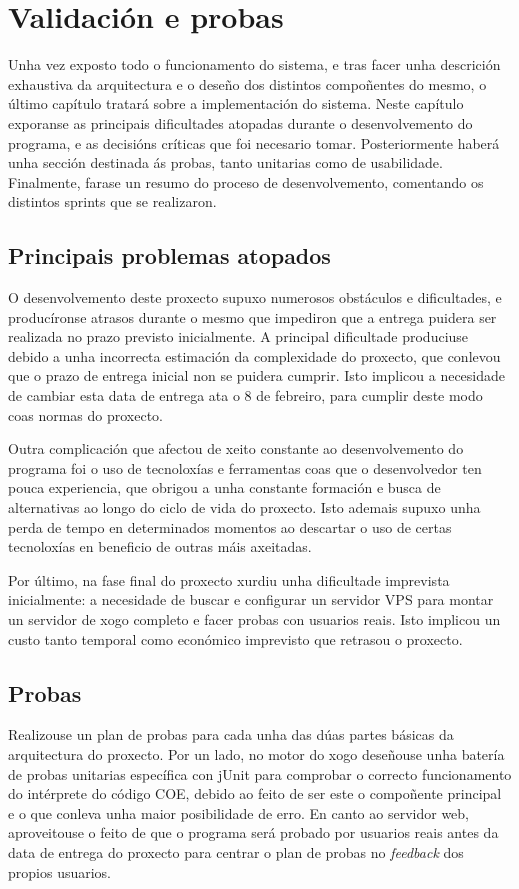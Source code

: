 \chapter{Validación e probas}
\label{ch:implementacion}
Unha vez exposto todo o funcionamento do sistema, e tras facer unha descrición
exhaustiva da arquitectura e o deseño dos distintos compoñentes do mesmo, o
último capítulo tratará sobre a implementación do sistema. Neste capítulo
exporanse as principais dificultades atopadas durante o desenvolvemento do
programa, e as decisións críticas que foi necesario tomar. Posteriormente haberá
unha sección destinada ás probas, tanto unitarias como de usabilidade.
Finalmente, farase un resumo do proceso de desenvolvemento, comentando os
distintos sprints que se realizaron.

\section{Principais problemas atopados}
O desenvolvemento deste proxecto supuxo numerosos obstáculos e dificultades, e
producíronse atrasos durante o mesmo que impediron que a entrega puidera ser
realizada no prazo previsto inicialmente. A principal dificultade produciuse
debido a unha incorrecta estimación da complexidade do proxecto, que conlevou
que o prazo de entrega inicial non se puidera cumprir. Isto implicou a
necesidade de cambiar esta data de entrega ata o 8 de febreiro, para cumplir
deste modo coas normas do proxecto.
\par
Outra complicación que afectou de xeito constante ao desenvolvemento do
programa foi o uso de tecnoloxías e ferramentas coas que o desenvolvedor ten
pouca experiencia, que obrigou a unha constante formación e busca de
alternativas ao longo do ciclo de vida do proxecto. Isto ademais supuxo unha
perda de tempo en determinados momentos ao descartar o uso de certas tecnoloxías
en beneficio de outras máis axeitadas.
\par
Por último, na fase final do proxecto xurdiu unha dificultade imprevista
inicialmente: a necesidade de buscar e configurar un servidor VPS para montar un
servidor de xogo completo e facer probas con usuarios reais. Isto implicou un
custo tanto temporal como económico imprevisto que retrasou o proxecto.

\section{Probas}
Realizouse un plan de probas para cada unha das dúas partes básicas da
arquitectura do proxecto. Por un lado, no motor do xogo deseñouse unha batería
de probas unitarias específica  con jUnit para comprobar o correcto
funcionamento do intérprete do código COE, debido ao feito de ser este o
compoñente principal e o que conleva unha maior posibilidade de erro. En canto
ao servidor web, aproveitouse o feito de que o programa será probado por
usuarios reais antes da data de entrega do proxecto para centrar o plan de
probas no \textit{feedback} dos propios usuarios.
 
